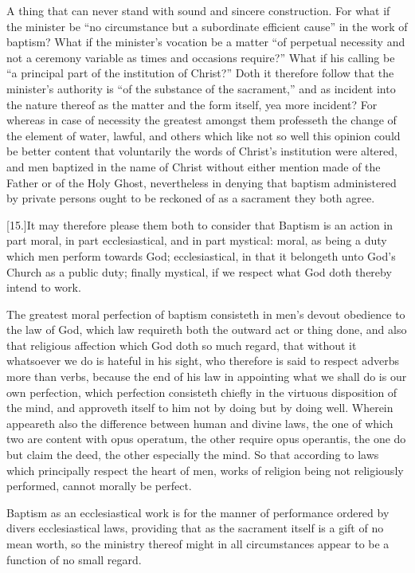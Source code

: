 A thing that can never stand with sound and sincere construction. For what if the minister be “no circumstance but a subordinate efficient cause” in the work of baptism? What if the minister’s vocation be a matter “of perpetual necessity and not a ceremony variable as times and occasions require?” What if his calling be “a principal part of the institution of Christ?” Doth it therefore follow that the minister’s authority is “of the substance of the sacrament,” and as incident into the nature thereof as  the matter and the form itself, yea more incident?
 For whereas in case of necessity the greatest amongst them professeth the change of the element of water, lawful, and others which like not so well this opinion could be better content that voluntarily the words of Christ’s institution were altered, and men baptized in the name of Christ without either mention made of the Father or of the Holy Ghost, nevertheless in denying that baptism administered by private persons ought to be reckoned of as a sacrament they both agree.

[15.]It may therefore please them both to consider that Baptism is an action in part moral, in part ecclesiastical, and in part mystical: moral, as being a duty which men perform towards God; ecclesiastical, in that it belongeth unto God’s Church as a public duty; finally mystical, if we respect what God doth thereby intend to work.

The greatest moral perfection of baptism consisteth in men’s devout obedience to the law of God, which law requireth both the outward act or thing done, and also that religious affection which God doth so much regard, that without it whatsoever we do is hateful in his sight, who therefore is said to respect adverbs more than verbs, because the end of his  law in appointing what we shall do is our own perfection, which perfection consisteth chiefly in the virtuous disposition of the mind, and approveth itself to him not by doing but by doing well. Wherein appeareth also the difference between human and divine laws, the one of which two are content with opus operatum, the other require opus operantis, the one do but claim the deed, the other especially the mind. So that according to laws which principally respect the heart of men, works of religion being not religiously performed, cannot morally be perfect.

Baptism as an ecclesiastical work is for the manner of performance ordered by divers ecclesiastical laws, providing that as the sacrament itself is a gift of no mean worth, so the ministry thereof might in all circumstances appear to be a function of no small regard.


